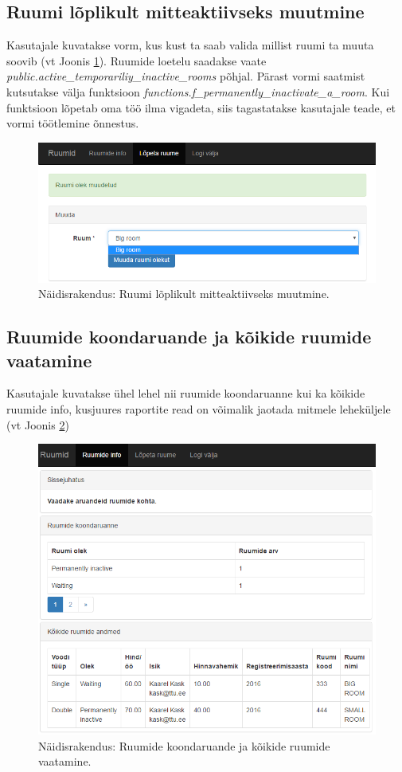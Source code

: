 \documentclass[a4paper,12pt]{article} %
\begin{document}
\subsection{Ruumi lõplikult mitteaktiivseks muutmine}
Kasutajale kuvatakse vorm, kus kust ta saab valida millist ruumi ta muuta soovib (vt Joonis \ref{fig_näidisrakendus_vorm}). Ruumide loetelu saadakse vaate  \textit{public.active\_temporariliy\_inactive\_rooms} põhjal. Pärast vormi saatmist kutsutakse välja funktsioon \textit{functions.f\_permanently\_inactivate\_a\_room}. Kui funktsioon lõpetab oma töö ilma vigadeta, siis tagastatakse kasutajale teade, et vormi töötlemine õnnestus.
\begin{figure}[H]
\centering
\includegraphics[width=\textwidth]{./diagrams/sample-app-form.png}
\caption{Näidisrakendus: Ruumi lõplikult mitteaktiivseks muutmine.}
\label{fig_näidisrakendus_vorm}
\end{figure}
\subsection{Ruumide koondaruande ja kõikide ruumide vaatamine}
Kasutajale kuvatakse ühel lehel nii ruumide koondaruanne kui ka kõikide ruumide info, kusjuures raportite read on võimalik jaotada mitmele leheküljele (vt Joonis \ref{fig_näidisrakendus_raportid})
\begin{figure}[H]
\centering
\includegraphics[width=\textwidth]{./diagrams/sample-app-reports.png}
\caption{Näidisrakendus: Ruumide koondaruande ja kõikide ruumide vaatamine.}
\label{fig_näidisrakendus_raportid}
\end{figure}
\end{document}
